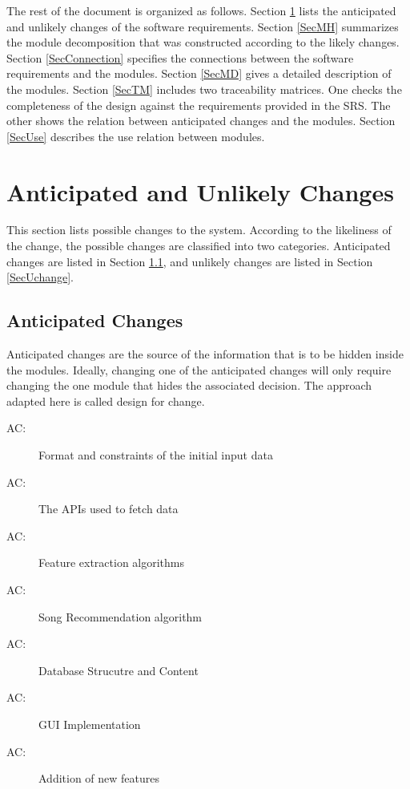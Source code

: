 \documentclass[12pt, titlepage]{article}
\newcounter{acnum}
\newcommand{\actheacnum}{AC\theacnum}
\begin{document}
The rest of the document is organized as follows. Section
\ref{SecChange} lists the anticipated and unlikely changes of the software
requirements. Section \ref{SecMH} summarizes the module decomposition that
was constructed according to the likely changes. Section \ref{SecConnection}
specifies the connections between the software requirements and the
modules. Section \ref{SecMD} gives a detailed description of the
modules. Section \ref{SecTM} includes two traceability matrices. One checks
the completeness of the design against the requirements provided in the SRS. The
other shows the relation between anticipated changes and the modules. Section
\ref{SecUse} describes the use relation between modules.

\section{Anticipated and Unlikely Changes} \label{SecChange}

This section lists possible changes to the system. According to the likeliness
of the change, the possible changes are classified into two
categories. Anticipated changes are listed in Section \ref{SecAchange}, and
unlikely changes are listed in Section \ref{SecUchange}.

\subsection{Anticipated Changes} \label{SecAchange}

Anticipated changes are the source of the information that is to be hidden
inside the modules. Ideally, changing one of the anticipated changes will only
require changing the one module that hides the associated decision. The approach
adapted here is called design for
change.

\begin{description}
\item[ \actheacnum \label{acHardware}:] Format and constraints of the initial input data
\item[ \actheacnum \label{acInput}:] The APIs used to fetch data
\item[ \actheacnum \label{acInput}:] Feature extraction algorithms
\item[ \actheacnum \label{acInput}:] Song Recommendation algorithm
\item[ \actheacnum \label{acInput}:] Database Strucutre and Content
\item[ \actheacnum \label{acInput}:] GUI Implementation
\item[ \actheacnum \label{acInput}:] Addition of new features
\end{description}
\end{document}
